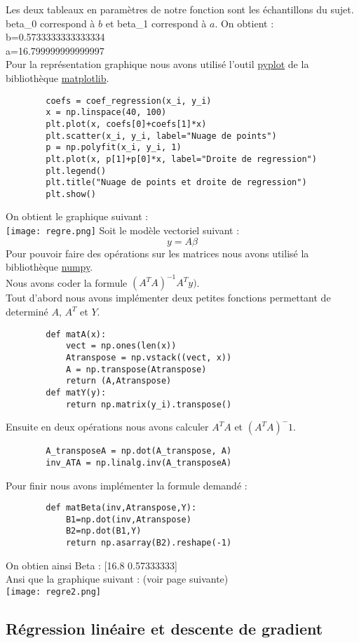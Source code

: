 \documentclass{article}
\begin{document}
    Les deux tableaux en paramètres de notre fonction sont les échantillons du sujet.
    beta\_0 correspond à $b$ et beta\_1 correspond à $a$.
    On obtient : \\
    b=0.5733333333333334 \\
    a=16.799999999999997 \\
    \newpage
    Pour la représentation graphique nous avons utilisé l'outil \href{https://matplotlib.org/api/pyplot_api.html}{pyplot} de la bibliothèque \href{https://matplotlib.org}{matplotlib}.
    \begin{lstlisting}
        coefs = coef_regression(x_i, y_i)
        x = np.linspace(40, 100)
        plt.plot(x, coefs[0]+coefs[1]*x)
        plt.scatter(x_i, y_i, label="Nuage de points")
        p = np.polyfit(x_i, y_i, 1)
        plt.plot(x, p[1]+p[0]*x, label="Droite de regression")
        plt.legend()
        plt.title("Nuage de points et droite de regression")
        plt.show()
    \end{lstlisting} 
    On obtient le graphique suivant : \\
    \texttt{[image: regre.png]}
    \newpage
    Soit le modèle vectoriel suivant : 
    \begin{equation*}
        y=A\beta
    \end{equation*}
    Pour pouvoir faire des opérations sur les matrices nous avons utilisé la bibliothèque \href{https://numpy.org}{numpy}.
    \\ Nous avons coder la formule $(A^TA)^{-1}A^Ty)$. \\
    Tout d'abord nous avons implémenter deux petites fonctions permettant de determiné $A$, $A^T$ et $Y$.
    \begin{lstlisting}
        def matA(x):
            vect = np.ones(len(x))
            Atranspose = np.vstack((vect, x))
            A = np.transpose(Atranspose)
            return (A,Atranspose)
        def matY(y):
            return np.matrix(y_i).transpose()
    \end{lstlisting}
    Ensuite en deux opérations nous avons calculer $A^TA$ et $(A^TA)^-1$.
    \begin{lstlisting}
        A_transposeA = np.dot(A_transpose, A)
        inv_ATA = np.linalg.inv(A_transposeA)
    \end{lstlisting}
    Pour finir nous avons implémenter la formule demandé : 
    \begin{lstlisting}
        def matBeta(inv,Atranspose,Y):
            B1=np.dot(inv,Atranspose)
            B2=np.dot(B1,Y)
            return np.asarray(B2).reshape(-1)
    \end{lstlisting}
    On obtien ainsi Beta : [16.8         0.57333333] \\
    Ansi que la graphique suivant : (voir page suivante)\\
    \texttt{[image: regre2.png]}
    \newpage
    \subsection{Régression linéaire et descente de gradient}
\end{document}
